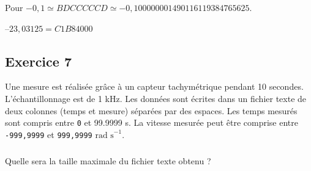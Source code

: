 \documentclass[10pt,fleqn]{article} %
\begin{document}
\begin{multicols}{2}
\begin{corrige}
Pour $-0,1\simeq BDCCCCCD \simeq -0,100000001490116119384765625$.

$–23,03125 = C1B84000$
\end{corrige}
\else
\fi

\subsection*{Exercice 7}
\setcounter{subparagraph}{0}
Une mesure est réalisée grâce à un capteur tachymétrique pendant 10 secondes. L'échantillonnage est de 1 kHz. Les données sont écrites dans un fichier texte de deux colonnes (temps et mesure) séparées par des espaces. Les temps mesurés sont compris entre \texttt{0} et {99.9999} s. La vitesse mesurée peut être comprise entre \texttt{-999,9999} et \texttt{999,9999} $\text{rad s}^{-1}$.
\subparagraph*{}\textit{}{Quelle sera la taille maximale du fichier texte obtenu ?}

\end{multicols}
\end{document}
